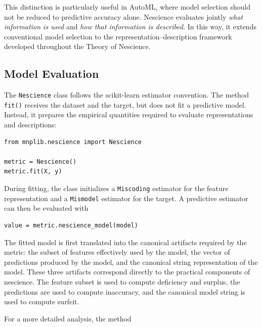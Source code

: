 This distinction is particularly useful in AutoML, where model selection should not be reduced to predictive accuracy alone. Nescience evaluates jointly \emph{what information is used} and \emph{how that information is described}. In this way, it extends conventional model selection to the representation--description framework developed throughout the Theory of Nescience.


\subsection*{Model Evaluation}

The \texttt{Nescience} class follows the scikit-learn estimator convention. The method \texttt{fit()} receives the dataset and the target, but does not fit a predictive model. Instead, it prepares the empirical quantities required to evaluate representations and descriptions:

\begin{sourcecode}
{\scriptsize
\begin{verbatim}
from mnplib.nescience import Nescience

metric = Nescience()
metric.fit(X, y)
\end{verbatim}}
\end{sourcecode}

During fitting, the class initializes a \texttt{Miscoding} estimator for the feature representation and a \texttt{Mismodel} estimator for the target. A predictive estimator can then be evaluated with

\begin{sourcecode}
{\scriptsize
\begin{verbatim}
value = metric.nescience_model(model)
\end{verbatim}}
\end{sourcecode}

The fitted model is first translated into the canonical artifacts required by the metric: the subset of features effectively used by the model, the vector of predictions produced by the model, and the canonical string representation of the model. These three artifacts correspond directly to the practical components of nescience. The feature subset is used to compute deficiency and surplus, the predictions are used to compute inaccuracy, and the canonical model string is used to compute surfeit.

For a more detailed analysis, the method


